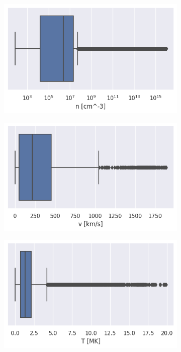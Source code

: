 \begin{figure}[ht]
     \centering
     \begin{subfigure}[b]{0.32\textwidth}
         \centering
         \includegraphics[width=\textwidth]{figures/volume_bp.png}
     \end{subfigure}
     \hfill
     \begin{subfigure}[b]{0.32\textwidth}
         \centering
         \includegraphics[width=\textwidth]{figures/velocity_bp.png}
     \end{subfigure}
     \hfill
     \begin{subfigure}[b]{0.32\textwidth}
         \centering
         \includegraphics[width=\textwidth]{figures/temperature_bp.png}

\end{subfigure}
\end{figure}
